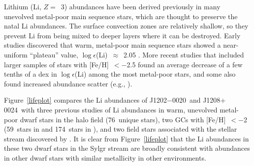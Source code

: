 \documentclass[twocolumn,tighten]{aastex62}
\newcommand{\jtwo}{J1202$-$0020}
\newcommand{\jeight}{J1208$+$0024}
\begin{document}
Lithium (Li, $Z =$~3) abundances have been derived previously in many
unevolved metal-poor main sequence stars, 
which are thought to preserve the natal Li abundances.
The surface convection zones are relatively shallow,
so they prevent Li from being mixed to deeper layers
where it can be destroyed.
Early studies discovered that warm, metal-poor
main sequence stars showed a near-uniform ``plateau'' value,
$\log\epsilon$(Li)~$\approx$~2.05
\citep{spite82,spite84}.
More recent studies that included larger samples
of stars with [Fe/H]~$< -$2.5
found an average decrease of a few tenths of a dex in $\log\epsilon$(Li)
among the most metal-poor stars,
and some also found increased abundance scatter
(e.g., \citealt{ryan99,boesgaard05,aoki09li,melendez10}).

Figure~\ref{lifeplot} compares the Li abundances of \jtwo\ and \jeight\ 
with three previous studies of Li abundances in 
warm, unevolved metal-poor dwarf stars
in the halo field (76~unique stars),
two GCs with [Fe/H]~$< -$2
(59~stars in  and
174~stars in ),
and two field stars associated with the 
stellar stream discovered by \citet{helmi99}.
It is clear from Figure~\ref{lifeplot}
that the Li abundances in these
two dwarf stars in the Sylgr stream
are broadly consistent with abundances
in other dwarf stars
with similar metallicity 
in other environments.
\end{document}
